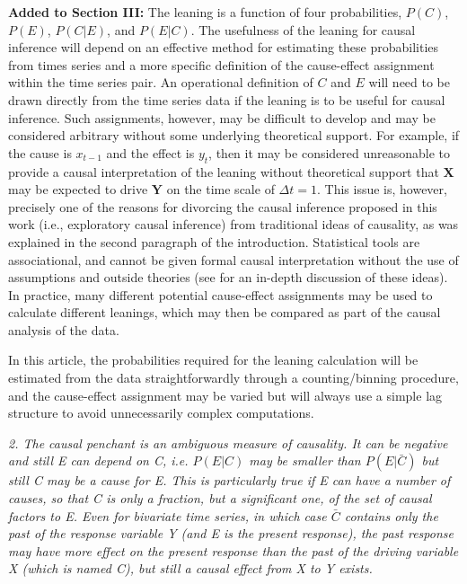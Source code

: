 \documentclass[a4paper,11pt]{article}
\begin{document}
{\bf Added to Section III:} The leaning is a function of four probabilities, $P(C)$, $P(E)$, $P(C|E)$, and $P(E|C)$.  The usefulness of the leaning for causal inference will depend on an effective method for estimating these probabilities from times series and a more specific definition of the cause-effect assignment within the time series pair.  An operational definition of $C$ and $E$ will need to be drawn directly from the time series data if the leaning is to be useful for causal inference.  Such assignments, however, may be difficult to develop and may be considered arbitrary without some underlying theoretical support.  For example, if the cause is $x_{t-1}$ and the effect is $y_{t}$, then it may be considered unreasonable to provide a causal interpretation of the leaning without theoretical support that $\mathbf{X}$ may be expected to drive $\mathbf{Y}$ on the time scale of $\Delta t=1$.  This issue is, however, precisely one of the reasons for divorcing the causal inference proposed in this work (i.e., exploratory causal inference) from traditional ideas of causality, as was explained in the second paragraph of the introduction.  Statistical tools are associational, and cannot be given formal causal interpretation without the use of assumptions and outside theories (see \cite{Illari2014} for an in-depth discussion of these ideas).  In practice, many different potential cause-effect assignments may be used to calculate different leanings, which may then be compared as part of the causal analysis of the data.

In this article, the probabilities required for the leaning calculation will be estimated from the data straightforwardly through a counting/binning procedure, and the cause-effect assignment may be varied but will always use a simple lag structure to avoid unnecessarily complex computations.

\vspace{0.5cm}
{\em 2. The causal penchant is an ambiguous measure of causality. It can be negative and still E can depend on C, i.e. $P(E|C)$ may be smaller than $P(E|\bar{C})$ but still C may be a cause for E. This is particularly true if E can have a number of causes, so that C is only a fraction, but a significant one, of the set of causal factors to E. Even for
bivariate time series, in which case $\bar{C}$ contains only the past of the response variable Y (and E is the present response), the past response may have more effect on the present response than the past of the driving variable X (which is named C), but still a causal effect from X to Y exists.}
\vspace{0.5cm}
\end{document}
